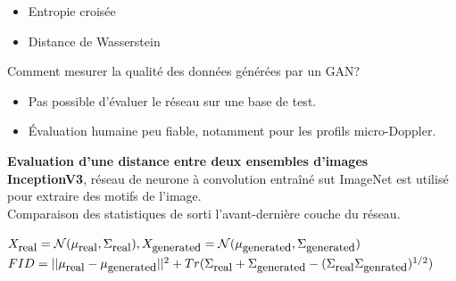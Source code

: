 \documentclass[a0,portrait]{a0poster}
\newcommand{\equtext}[1]{\mbox{\small{#1}}}
\begin{document}
\begin{multicols}{2}
\begin{tcolorbox}[colback=blue!5!white,colframe=blue!75!black,title={\section*{Différents types de GAN}}]
\begin{itemize}
    \item Entropie croisée
    \item Distance de Wasserstein
\end{itemize}
\end{tcolorbox}
\bigskip

\begin{tcolorbox}[colback=blue!5!lime,colframe=green!75!black,title={\section*{Mesurer les performances d'un GAN?}}]
Comment mesurer la qualité des données générées par un GAN?
\begin{itemize}
    \item Pas possible d'évaluer le réseau sur une base de test.
    \item Évaluation humaine peu fiable, notamment pour les profils micro-Doppler.
\end{itemize}
\end{tcolorbox}
\bigskip


\begin{tcolorbox}[colback=blue!5!white,colframe=blue!75!black,title={\section*{FID (Fréchet Inception Distance)}}]
\textbf{Evaluation d'une distance entre deux ensembles d'images}\\
\textbf{InceptionV3}, réseau de neurone à convolution entraîné sut ImageNet est utilisé pour extraire des motifs de l'image.\\
Comparaison des statistiques de sorti l'avant-dernière couche du réseau.
\begin{center}
$X_{\equtext{real}}=\mathcal{N}(\mu_{\equtext{real}}, \Sigma_{\equtext{real}}), X_{\equtext{generated}}=\mathcal{N}(\mu_{\equtext{generated}}, \Sigma_{\equtext{generated}})$
$FID = ||\mu_{\equtext{real}} - \mu_{\equtext{generated}}||^2 + Tr(\Sigma_{\equtext{real}} + \Sigma_{\equtext{generated}}  - (\Sigma_{\equtext{real}} \Sigma_{\equtext{genrated}})^{1/2})$
\end{center}
\end{tcolorbox}
\bigskip


\end{multicols}
\end{document}
